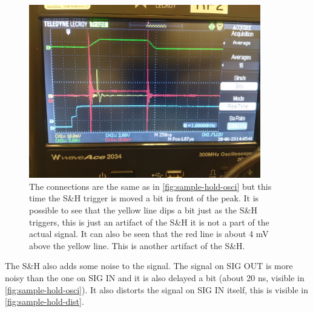 \documentclass[a4paper, 10pt]{article}
\begin{document}
\begin{figure}[H]
    \centering
    \includegraphics[width=0.9\textwidth]{../images/sample-hold-osci-2.jpg}
    \caption{The connections are the same as in \cref{fig:sample-hold-osci} but this time the S\&H trigger is moved a bit in front of the peak. It is possible to see that the yellow line dips a bit just as the S\&H triggers, this is just an artifact of the S\&H it is not a part of the actual signal. It can also be seen that the red line is about 4 \si{\milli\volt} above the yellow line. This is another artifact of the S\&H.}
    \label{fig:sample-hold-osci-2}
\end{figure}

The S\&H also adds some noise to the signal.
The signal on SIG OUT is more noisy than the one on SIG IN and it is also delayed a bit (about 20 \si{\nano\second}, visible in \cref{fig:sample-hold-osci}).
It also distorts the signal on SIG IN itself, this is visible in \cref{fig:sample-hold-dist}.
\end{document}
